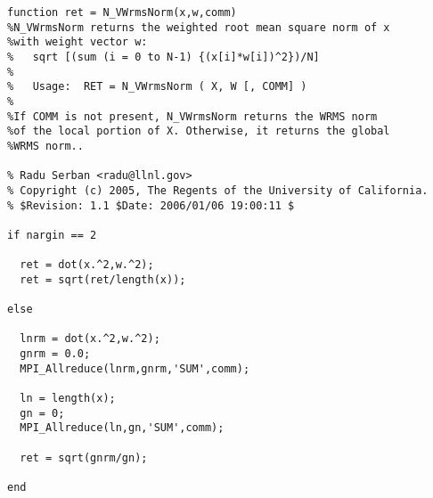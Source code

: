 \begin{lstlisting}[linerange={1-1,11-35}]
function ret = N_VWrmsNorm(x,w,comm)
%N_VWrmsNorm returns the weighted root mean square norm of x 
%with weight vector w: 
%   sqrt [(sum (i = 0 to N-1) {(x[i]*w[i])^2})/N]
%
%   Usage:  RET = N_VWrmsNorm ( X, W [, COMM] )   
%
%If COMM is not present, N_VWrmsNorm returns the WRMS norm
%of the local portion of X. Otherwise, it returns the global
%WRMS norm..

% Radu Serban <radu@llnl.gov>
% Copyright (c) 2005, The Regents of the University of California.
% $Revision: 1.1 $Date: 2006/01/06 19:00:11 $

if nargin == 2
  
  ret = dot(x.^2,w.^2);
  ret = sqrt(ret/length(x));
  
else
  
  lnrm = dot(x.^2,w.^2);
  gnrm = 0.0;
  MPI_Allreduce(lnrm,gnrm,'SUM',comm);

  ln = length(x);
  gn = 0;
  MPI_Allreduce(ln,gn,'SUM',comm);
  
  ret = sqrt(gnrm/gn);
  
end

\end{lstlisting}
